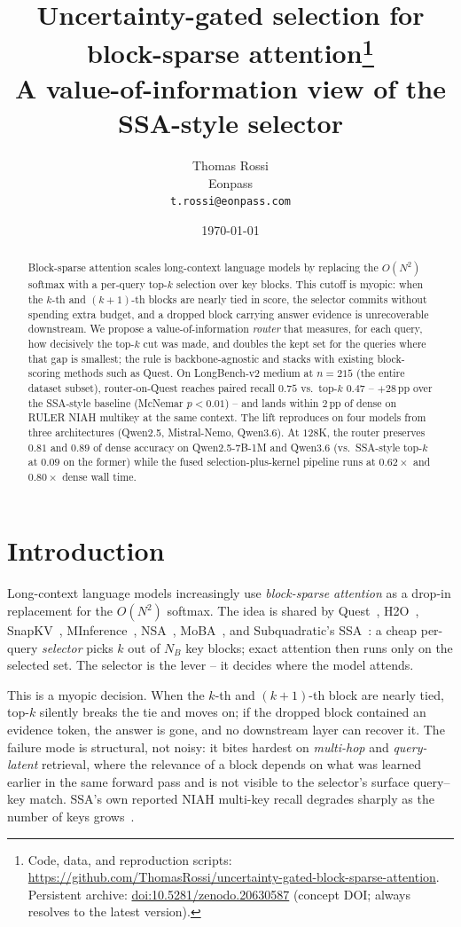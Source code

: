 \documentclass[11pt]{article}
\title{Uncertainty-gated selection for block-sparse attention\thanks{\small Code, data, and reproduction scripts: \url{https://github.com/ThomasRossi/uncertainty-gated-block-sparse-attention}. Persistent archive: \href{https://doi.org/10.5281/zenodo.20630587}{doi:10.5281/zenodo.20630587} (concept DOI; always resolves to the latest version).}\\[0.3em]
\large A value-of-information view of the SSA-style selector}
\author{Thomas Rossi \\ Eonpass \\ \texttt{t.rossi@eonpass.com}}
\date{\today}
\theoremstyle{remark}
\newcommand{\NB}{N_{\!B}}
\begin{document}
\maketitle

\begin{abstract}
Block-sparse attention scales long-context language models by replacing the $O(N^2)$ softmax with a per-query top-$k$ selection over key blocks. This cutoff is myopic: when the $k$-th and $(k{+}1)$-th blocks are nearly tied in score, the selector commits without spending extra budget, and a dropped block carrying answer evidence is unrecoverable downstream. We propose a value-of-information \emph{router} that measures, for each query, how decisively the top-$k$ cut was made, and doubles the kept set for the queries where that gap is smallest; the rule is backbone-agnostic and stacks with existing block-scoring methods such as Quest. On LongBench-v2 medium at $n=215$ (the entire dataset subset), router-on-Quest reaches paired recall $0.75$ vs.\ top-$k$ $0.47$ -- $+28$\,pp over the SSA-style baseline (McNemar $p<0.01$) -- and lands within $2$\,pp of dense on RULER NIAH multikey at the same context. The lift reproduces on four models from three architectures (Qwen2.5, Mistral-Nemo, Qwen3.6). At $128$K, the router preserves $0.81$ and $0.89$ of dense accuracy on Qwen2.5-7B-1M and Qwen3.6 (vs.\ SSA-style top-$k$ at $0.09$ on the former) while the fused selection-plus-kernel pipeline runs at $0.62\times$ and $0.80\times$ dense wall time.
\end{abstract}

\section{Introduction}

Long-context language models increasingly use \emph{block-sparse attention} as a drop-in replacement for the $O(N^2)$ softmax. The idea is shared by Quest~\citep{tang2024quest}, H2O~\citep{zhang2023h2o}, SnapKV~\citep{li2024snapkv}, MInference~\citep{jiang2024minference}, NSA~\citep{yuan2025nsa}, MoBA~\citep{lu2025moba}, and Subquadratic's SSA~\citep{ssa2025}: a cheap per-query \emph{selector} picks $k$ out of $\NB$ key blocks; exact attention then runs only on the selected set. The selector is the lever -- it decides where the model attends.

This is a myopic decision. When the $k$-th and $(k{+}1)$-th block are nearly tied, top-$k$ silently breaks the tie and moves on; if the dropped block contained an evidence token, the answer is gone, and no downstream layer can recover it. The failure mode is structural, not noisy: it bites hardest on \emph{multi-hop} and \emph{query-latent} retrieval, where the relevance of a block depends on what was learned earlier in the same forward pass and is not visible to the selector's surface query--key match. SSA's own reported NIAH multi-key recall degrades sharply as the number of keys grows~\citep{ssa2025}.
\end{document}
